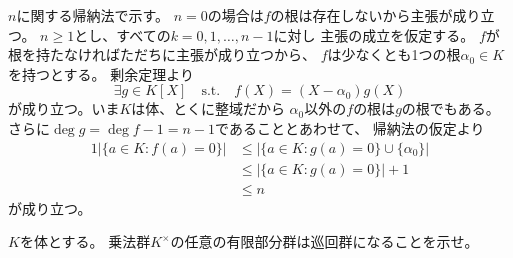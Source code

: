 \documentclass[report]{jlreq}
\begin{document}
\begin{answer}
    $n$に関する帰納法で示す。
    $n = 0$の場合は$f$の根は存在しないから主張が成り立つ。
    $n \ge 1$とし、すべての$k = 0, 1, \dots, n - 1$に対し
    主張の成立を仮定する。
    $f$が根を持たなければただちに主張が成り立つから、
    $f$は少なくとも1つの根$\alpha_0 \in K$を持つとする。
    剰余定理より
    \begin{equation}
        \exists g \in K[X]
        \quad \text{s.t.} \quad
        f(X) = (X - \alpha_0) g(X)
    \end{equation}
    が成り立つ。いま$K$は体、とくに整域だから
    $\alpha_0$以外の$f$の根は$g$の根でもある。
    さらに$\deg g = \deg f - 1 = n - 1$であることとあわせて、
    帰納法の仮定より
    \begin{alignat}{1}
        |\{ a \in K \colon f(a) = 0 \}|
            &\le |\{ a \in K \colon g(a) = 0 \} \cup \{ \alpha_0 \}| \\
            &\le |\{ a \in K \colon g(a) = 0 \}| + 1 \\
            &\le n
    \end{alignat}
    が成り立つ。
\end{answer}


\begin{problem}[代数学II 2.22]
    $K$を体とする。
    乗法群$K^\times$の任意の有限部分群は巡回群になることを示せ。
\end{problem}
\end{document}
